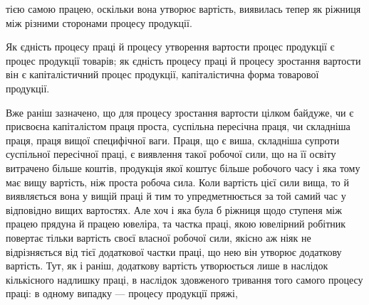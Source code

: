 \parcont{}  %
тією самою працею, оскільки вона утворює вартість, виявилась
тепер як ріжниця між різними сторонами процесу продукції.

Як єдність процесу праці й процесу утворення вартости процес
продукції є процес продукції товарів; як єдність процесу
праці й процесу зростання вартости він є капіталістичний процес
продукції, капіталістична форма товарової продукції.

Вже раніш зазначено, що для процесу зростання вартости
цілком байдуже, чи є присвоєна капіталістом праця проста, суспільна
пересічна праця, чи складніша праця, праця вищої специфічної
ваги. Праця, що є виша, складніша супроти суспільної пересічної
праці, є виявлення такої робочої сили, що на її освіту витрачено
більше коштів, продукція якої коштує більше робочого
часу і яка тому має вищу вартість, ніж проста робоча сила.
Коли вартість цієї сили вища, то й виявляється вона у вищій
праці й тим то упредметнюється за той самий час у відповідно
вищих вартостях. Але хоч і яка була б ріжниця щодо ступеня
між працею прядуна й працею ювеліра, та частка праці, якою
ювелірний робітник повертає тільки вартість своєї власної робочої
сили, якісно аж ніяк не відрізняється від тієї додаткової
частки праці, що нею він утворює додаткову вартість. Тут, як і
раніш, додаткову вартість утворюється лише в наслідок кількісного
надлишку праці, в наслідок здовженого тривання того самого
процесу праці: в одному випадку — процесу продукції пряжі,
